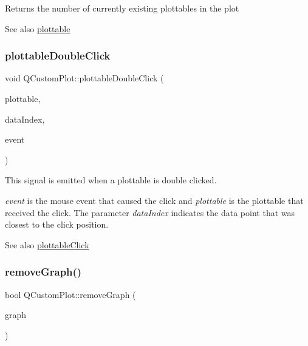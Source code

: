 Returns the number of currently existing plottables in the plot

\begin{DoxySeeAlso}{See also}
\mbox{\hyperlink{class_q_custom_plot_a32de81ff53e263e785b83b52ecd99d6f}{plottable}} 
\end{DoxySeeAlso}
\mbox{\label{class_q_custom_plot_a86a3ab7263c9c4e008e70d6c5fce9fbd}} 
\subsubsection{\texorpdfstring{plottable\+Double\+Click}{plottableDoubleClick}}
{\footnotesize\ttfamily void Q\+Custom\+Plot\+::plottable\+Double\+Click (\begin{DoxyParamCaption}\item[{\mbox{\hyperlink{class_q_c_p_abstract_plottable}{Q\+C\+P\+Abstract\+Plottable}} $\ast$}]{plottable,  }\item[{int}]{data\+Index,  }\item[{Q\+Mouse\+Event $\ast$}]{event }\end{DoxyParamCaption})\hspace{0.3cm}{\ttfamily [signal]}}

This signal is emitted when a plottable is double clicked.

{\itshape event} is the mouse event that caused the click and {\itshape plottable} is the plottable that received the click. The parameter {\itshape data\+Index} indicates the data point that was closest to the click position.

\begin{DoxySeeAlso}{See also}
\mbox{\hyperlink{class_q_custom_plot_af5fe78b8bc9e4e96df921612837fd4fd}{plottable\+Click}} 
\end{DoxySeeAlso}
\mbox{\label{class_q_custom_plot_a903561be895fb6528a770d66ac5e6713}} 
\subsubsection{\texorpdfstring{remove\+Graph()}{removeGraph()}\hspace{0.1cm}{\footnotesize\ttfamily [1/2]}}
{\footnotesize\ttfamily bool Q\+Custom\+Plot\+::remove\+Graph (\begin{DoxyParamCaption}\item[{\mbox{\hyperlink{class_q_c_p_graph}{Q\+C\+P\+Graph}} $\ast$}]{graph }\end{DoxyParamCaption})}

